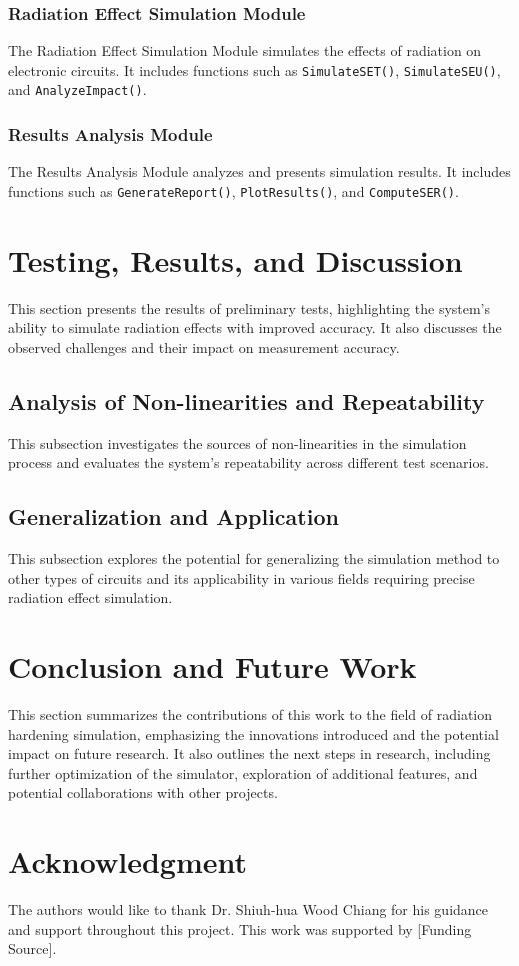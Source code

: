 \documentclass[conference]{IEEEtran}
\begin{document}
\subsubsection{Radiation Effect Simulation Module}
The Radiation Effect Simulation Module simulates the effects of radiation on electronic circuits. It includes functions such as \texttt{SimulateSET()}, \texttt{SimulateSEU()}, and \texttt{AnalyzeImpact()}.

\subsubsection{Results Analysis Module}
The Results Analysis Module analyzes and presents simulation results. It includes functions such as \texttt{GenerateReport()}, \texttt{PlotResults()}, and \texttt{ComputeSER()}.

\section{Testing, Results, and Discussion}
This section presents the results of preliminary tests, highlighting the system's ability to simulate radiation effects with improved accuracy. It also discusses the observed challenges and their impact on measurement accuracy.

\subsection{Analysis of Non-linearities and Repeatability}
This subsection investigates the sources of non-linearities in the simulation process and evaluates the system's repeatability across different test scenarios.

\subsection{Generalization and Application}
This subsection explores the potential for generalizing the simulation method to other types of circuits and its applicability in various fields requiring precise radiation effect simulation.

\section{Conclusion and Future Work}
This section summarizes the contributions of this work to the field of radiation hardening simulation, emphasizing the innovations introduced and the potential impact on future research. It also outlines the next steps in research, including further optimization of the simulator, exploration of additional features, and potential collaborations with other projects.

\section*{Acknowledgment}
The authors would like to thank Dr. Shiuh-hua Wood Chiang for his guidance and support throughout this project. This work was supported by [Funding Source].



\end{document}
